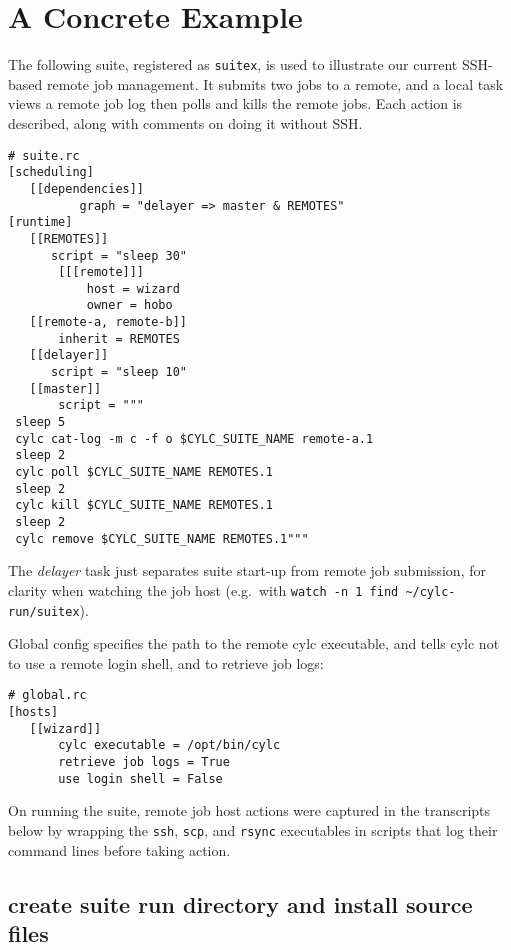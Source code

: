 \documentclass{article}
\begin{document}
\section{A Concrete Example}

The following suite, registered as \lstinline=suitex=, is used to illustrate
our current SSH-based remote job management. It submits two jobs to a remote,
and a local task views a remote job log then polls and kills the remote jobs.
Each action is described, along with comments on doing it without SSH. 

\lstset{language=suiterc}
\begin{lstlisting}
# suite.rc
[scheduling]
   [[dependencies]]
          graph = "delayer => master & REMOTES"
[runtime]
   [[REMOTES]]
      script = "sleep 30"
       [[[remote]]]
           host = wizard
           owner = hobo
   [[remote-a, remote-b]]
       inherit = REMOTES
   [[delayer]]
      script = "sleep 10"
   [[master]]
       script = """
 sleep 5
 cylc cat-log -m c -f o $CYLC_SUITE_NAME remote-a.1
 sleep 2
 cylc poll $CYLC_SUITE_NAME REMOTES.1
 sleep 2
 cylc kill $CYLC_SUITE_NAME REMOTES.1
 sleep 2
 cylc remove $CYLC_SUITE_NAME REMOTES.1"""
\end{lstlisting}

The {\em delayer} task just separates suite start-up from remote job
submission, for clarity when watching the job host (e.g.\ with
\lstinline=watch -n 1 find ~/cylc-run/suitex=).

Global config specifies the path to the remote cylc executable, and tells cylc
not to use a remote login shell, and to retrieve job logs:
\begin{lstlisting}
# global.rc
[hosts]
   [[wizard]]
       cylc executable = /opt/bin/cylc
       retrieve job logs = True
       use login shell = False
\end{lstlisting}

On running the suite, remote job host actions were captured in the transcripts
below by wrapping the \lstinline=ssh=, \lstinline=scp=, and \lstinline=rsync=
executables in scripts that log their command lines before taking action.

\renewcommand*\DTstylecomment{\normalfont\ttfamily\color{comments}}
\renewcommand*\DTstyle{\bf\ttfamily\textcolor{identifiers}}

\subsection{create suite run directory and install source files}
\end{document}
